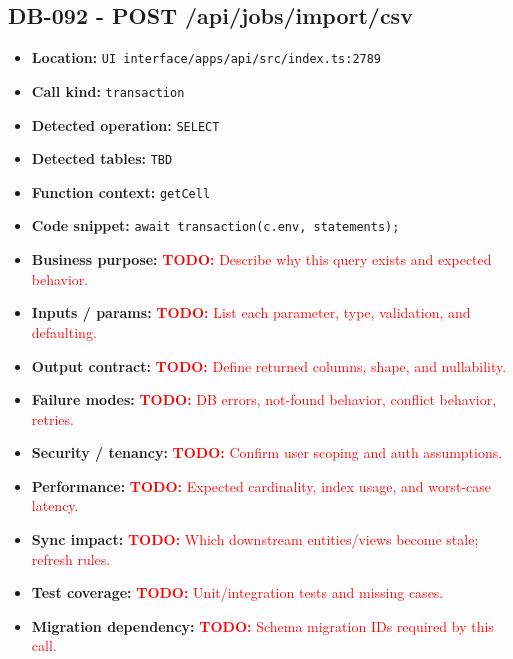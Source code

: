 \documentclass[11pt]{article}
\newcommand{\todoitem}[1]{\textcolor{red}{\textbf{TODO:} #1}}
\begin{document}
\subsection{DB-092 - POST /api/jobs/import/csv}
\begin{itemize}[leftmargin=1.5em]
\item \textbf{Location:} \texttt{UI interface/apps/api/src/index.ts:2789}
\item \textbf{Call kind:} \texttt{transaction}
\item \textbf{Detected operation:} \texttt{SELECT}
\item \textbf{Detected tables:} \texttt{TBD}
\item \textbf{Function context:} \texttt{getCell}
\item \textbf{Code snippet:} \texttt{await transaction(c.env, statements);}
\item \textbf{Business purpose:} \todoitem{Describe why this query exists and expected behavior.}
\item \textbf{Inputs / params:} \todoitem{List each parameter, type, validation, and defaulting.}
\item \textbf{Output contract:} \todoitem{Define returned columns, shape, and nullability.}
\item \textbf{Failure modes:} \todoitem{DB errors, not-found behavior, conflict behavior, retries.}
\item \textbf{Security / tenancy:} \todoitem{Confirm user scoping and auth assumptions.}
\item \textbf{Performance:} \todoitem{Expected cardinality, index usage, and worst-case latency.}
\item \textbf{Sync impact:} \todoitem{Which downstream entities/views become stale; refresh rules.}
\item \textbf{Test coverage:} \todoitem{Unit/integration tests and missing cases.}
\item \textbf{Migration dependency:} \todoitem{Schema migration IDs required by this call.}
\end{itemize}
\end{document}
